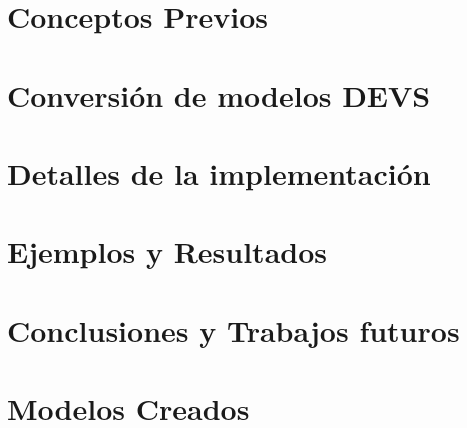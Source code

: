 \documentclass[a4paper,	11pt]{report}
\begin{document}
\chapter{Conceptos Previos}


\chapter{Conversión de modelos DEVS}


\chapter{Detalles de la implementación}


\chapter{Ejemplos y Resultados}


\chapter{Conclusiones y Trabajos futuros}

\appendix
\chapter{Modelos Creados}

\newpage


\nocite{*}


\cleardoublepage



\end{document}
